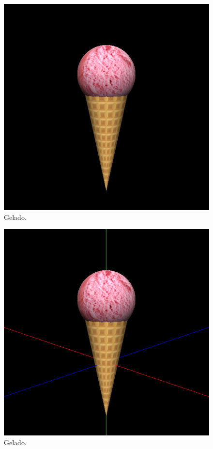 \documentclass[12pt, a4paper]{article}
\begin{document}
\begin{figure}[H]
    \centering
    \includegraphics[width=\textwidth]{res/phase4/IceCream.png}
    \caption{Gelado.}
\end{figure}

\begin{figure}[H]
    \centering
    \includegraphics[width=\textwidth]{res/phase4/IceCreamXYZ.png}
    \caption{Gelado.}
\end{figure}
\end{document}
